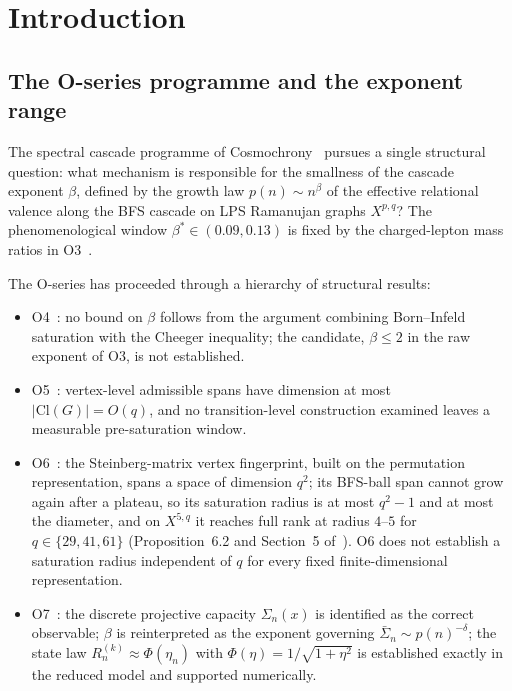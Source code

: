 \documentclass[11pt,a4paper]{article}
\theoremstyle{definition}
\theoremstyle{remark}
\newcommand{\bSigma}{\bar{\Sigma}}
\newcommand{\Rn}{R_n^{(k)}}
\newcommand{\etan}{\eta_n}
\newcommand{\Sigman}{\Sigma_n}
\begin{document}
    \clearpage
    \tableofcontents

    \clearpage

  \section{Introduction}
  \label{sec:intro}

  \subsection{The O-series programme and the exponent range}
    \label{sec:intro-programme}

    The spectral cascade programme of Cosmochrony~\cite{Cosmochrony} pursues a single
    structural question: what mechanism is responsible for the smallness of the cascade
    exponent $\beta$, defined by the growth law $p(n) \sim n^\beta$ of the effective
    relational valence along the BFS cascade on LPS Ramanujan graphs $X^{p,q}$?
    The phenomenological window $\beta^* \in (0.09, 0.13)$ is fixed by the charged-lepton
    mass ratios in O3~\cite{Beau2026a7}.

    The O-series has proceeded through a hierarchy of structural results:
    \begin{itemize}[nosep]
  \item O4~\cite{Beau2026a8}: no bound on $\beta$ follows from the argument combining
  Born--Infeld saturation with the Cheeger inequality; the candidate, $\beta \leq 2$ in the raw
  exponent of O3, is not established.
  \item O5~\cite{Beau2026a9}: vertex-level admissible spans have dimension at most
  $|\mathrm{Cl}(G)| = O(q)$, and no transition-level construction examined leaves a measurable
  pre-saturation window.
  \item O6~\cite{Beau2026a10}: the Steinberg-matrix vertex fingerprint, built on the permutation
  representation, spans a space of dimension $q^2$; its BFS-ball span cannot grow again after a
  plateau, so its saturation radius is at most $q^2-1$ and at most the diameter, and on $X^{5,q}$ it
  reaches full rank at radius $4$--$5$ for $q \in \{29,41,61\}$ (Proposition~6.2 and Section~5
  of~\cite{Beau2026a10}).
  O6 does not establish a saturation radius independent of $q$ for every fixed
  finite-dimensional representation.
  \item O7~\cite{Beau2026a11}: the discrete projective capacity $\Sigman(x)$ is identified
  as the correct observable; $\beta$ is reinterpreted as the exponent governing
  $\bSigma_n \sim p(n)^{-\delta}$; the state law $\Rn \approx \Phi(\etan)$
  with $\Phi(\eta) = 1/\sqrt{1+\eta^2}$ is established exactly in the reduced model
  and supported numerically.
    \end{itemize}
\end{document}
